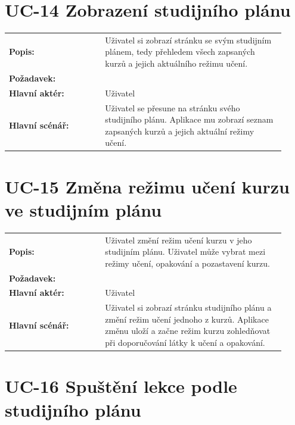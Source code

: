 \section{UC-14 Zobrazení studijního plánu}\label{sec:uc-14}

\begin{tabular}{p{0.32\linewidth}p{0.6\linewidth}}
  \textbf{Popis:} & Uživatel si zobrazí stránku se svým studijním plánem, tedy přehledem všech zapsaných kurzů a jejich aktuálního režimu učení. \\
  \textbf{Požadavek:} & \nameref{sec:fp-study-plan} \\
  \textbf{Hlavní aktér:} & Uživatel \\
  \textbf{Hlavní scénář:} & Uživatel se přesune na stránku svého studijního plánu. Aplikace mu zobrazí seznam zapsaných kurzů a jejich aktuální režimy učení. \\
\end{tabular}

\section{UC-15 Změna režimu učení kurzu ve studijním plánu}\label{sec:uc-15}

\begin{tabular}{p{0.32\linewidth}p{0.6\linewidth}}
  \textbf{Popis:} & Uživatel změní režim učení kurzu v jeho studijním plánu. Uživatel může vybrat mezi režimy učení, opakování a pozastavení kurzu.  \\
  \textbf{Požadavek:} & \nameref{sec:fp-study-plan} \\
  \textbf{Hlavní aktér:} & Uživatel \\
  \textbf{Hlavní scénář:} & Uživatel si zobrazí stránku studijního plánu a změní režim učení jednoho z kurzů. Aplikace změnu uloží a začne režim kurzu zohledňovat při doporučování látky k učení a opakování. \\
\end{tabular}

\section{UC-16 Spuštění lekce podle studijního plánu}\label{sec:uc-16}

